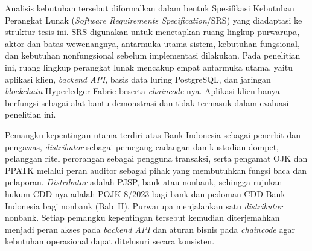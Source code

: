 Analisis kebutuhan tersebut diformalkan dalam bentuk Spesifikasi Kebutuhan
Perangkat Lunak (\textit{Software Requirements Specification}/SRS) yang diadaptasi
ke struktur tesis ini. SRS digunakan untuk menetapkan ruang lingkup purwarupa,
aktor dan batas wewenangnya, antarmuka utama sistem, kebutuhan fungsional, dan
kebutuhan nonfungsional sebelum implementasi dilakukan. Pada penelitian ini,
ruang lingkup perangkat lunak mencakup empat antarmuka utama, yaitu aplikasi
klien, \textit{backend API}, basis data luring PostgreSQL, dan jaringan
\textit{blockchain} Hyperledger Fabric beserta \textit{chaincode}-nya. Aplikasi klien hanya berfungsi sebagai alat bantu demonstrasi dan tidak termasuk dalam evaluasi penelitian ini.

Pemangku kepentingan utama terdiri atas Bank Indonesia sebagai penerbit dan
pengawas, \textit{distributor} sebagai pemegang cadangan dan kustodian dompet, pelanggan ritel perorangan
sebagai pengguna transaksi, serta pengamat OJK dan PPATK melalui peran auditor
sebagai pihak yang membutuhkan fungsi baca dan pelaporan. \textit{Distributor} adalah PJSP, bank atau nonbank, sehingga
rujukan hukum CDD-nya adalah POJK 8/2023 bagi bank dan pedoman CDD Bank Indonesia bagi nonbank (Bab~II). Purwarupa menjalankan satu \textit{distributor} nonbank. Setiap pemangku
kepentingan tersebut kemudian diterjemahkan menjadi
peran akses pada \textit{backend API} dan aturan bisnis pada \textit{chaincode}
agar kebutuhan operasional dapat ditelusuri secara konsisten.

